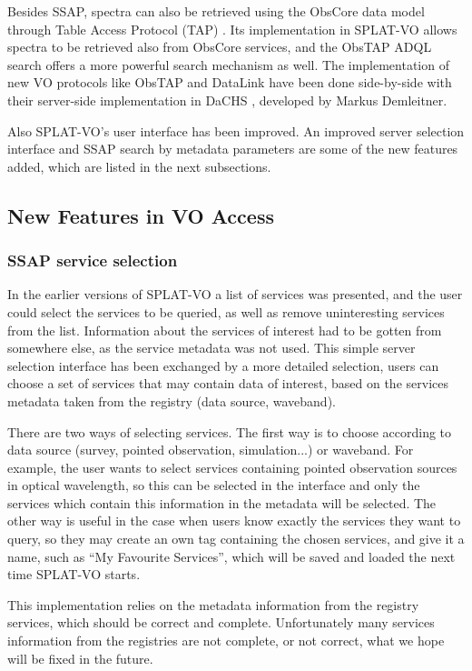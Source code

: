 \documentclass[final,authoryear,5p,times,twocolumn]{elsarticle}
\begin{document}
Besides SSAP, spectra can also be retrieved using the ObsCore data model
through Table Access Protocol (TAP)  \citep[known as ObsTap;][]{obstap}. Its implementation in
SPLAT-VO allows spectra to be retrieved also from ObsCore services, and
the ObsTAP ADQL \citep{adql} search offers a more powerful search
mechanism as well. The implementation of new VO protocols like ObsTAP
and DataLink have been done side-by-side with their server-side
implementation in DaCHS \citep[Data Center Helper Suite;][]{dachs},
developed by Markus Demleitner.

Also SPLAT-VO's user interface has been improved. An improved server
selection interface and SSAP search by metadata parameters are some of
the new features added, which are listed in the next subsections.

\subsection{New Features in VO Access}

\subsubsection{SSAP service selection}

In the earlier versions of SPLAT-VO a list of services was presented, and
the user could select the services to be queried, as well as remove
uninteresting services from the list. Information about the services
of interest had to be gotten from somewhere else, as the service
metadata was not used.  This simple server selection interface has
been exchanged by a more detailed selection, users can choose a set of
services that may contain data of interest, based on the services
metadata taken from the registry (data source, waveband).

There are two ways of selecting services. The first way is to choose
according to data source (survey, pointed observation, simulation...)
or waveband.  For example, the user wants to select services
containing pointed observation sources in optical wavelength, so this
can be selected in the interface and only the services which contain
this information in the metadata will be selected.  The other way is
useful in the case when users know exactly the services they want to
query, so they may create an own tag containing the chosen services,
and give it a name, such as ``My Favourite Services'', which will be saved
and loaded the next time SPLAT-VO starts.

This implementation relies on the metadata information from the
registry services, which should be correct and complete. Unfortunately
many services information from the registries are not complete, or not
correct, what we hope will be fixed in the future.
\end{document}

